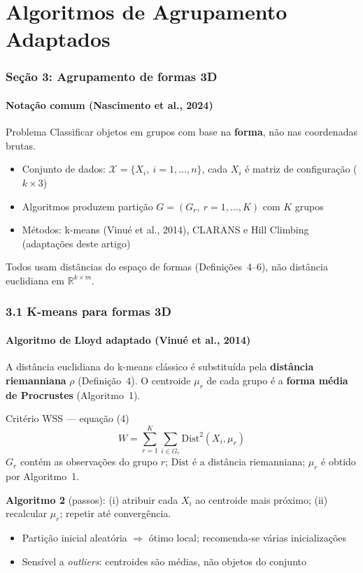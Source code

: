 \documentclass[brazilian,11pt]{beamer}
\begin{document}
\section[Algoritmos]{Algoritmos de Agrupamento Adaptados}

\begin{frame}
    \frametitle{Seção 3: Agrupamento de formas 3D}
    \framesubtitle{Notação comum (Nascimento et al., 2024)}

    \begin{block}{Problema}
        Classificar objetos em grupos com base na \textbf{forma}, não nas coordenadas brutas.
    \end{block}

    \begin{itemize}
        \item Conjunto de dados: $\mathcal{X} = \{X_i,\ i = 1,\ldots,n\}$, cada $X_i$ é matriz de configuração ($k \times 3$)
        \item Algoritmos produzem partição $G = (G_r,\ r = 1,\ldots,K)$ com $K$ grupos
        \item Métodos: k-means (Vinué et al., 2014), CLARANS e Hill Climbing (adaptações deste artigo)
    \end{itemize}

    \vspace{0.3em}
    \small Todos usam distâncias do espaço de formas (Definições~4--6), não distância euclidiana em $\mathbb{R}^{k \times m}$.
\end{frame}

\begin{frame}[shrink=8]
    \frametitle{3.1 K-means para formas 3D}
    \framesubtitle{Algoritmo de Lloyd adaptado (Vinué et al., 2014)}

    \small
    A distância euclidiana do k-means clássico é substituída pela \textbf{distância riemanniana} $\rho$ (Definição~4). O centroide $\mu_r$ de cada grupo é a \textbf{forma média de Procrustes} (Algoritmo~1).

    \begin{block}{Critério WSS --- equação (4)}
        \begin{equation}
            W = \sum_{r=1}^{K} \sum_{i \in G_r} \mathrm{Dist}^2(X_i, \mu_r)
        \end{equation}
        $G_r$ contém as observações do grupo $r$; $\mathrm{Dist}$ é a distância riemanniana; $\mu_r$ é obtido por Algoritmo~1.
    \end{block}

    \textbf{Algoritmo 2} (passos): (i) atribuir cada $X_i$ ao centroide mais próximo; (ii) recalcular $\mu_r$; repetir até convergência.

    \begin{itemize}
        \item Partição inicial aleatória $\Rightarrow$ ótimo local; recomenda-se várias inicializações
        \item Sensível a \textit{outliers}: centroides são médias, não objetos do conjunto
    \end{itemize}
\end{frame}
\end{document}
